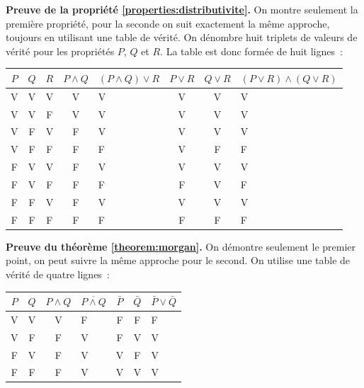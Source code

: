 \documentclass[10pt,notheorems]{beamer}
\theoremstyle{plain}
\theoremstyle{definition} %
\begin{document}
  \begin{notes}
    \mbox{}
    \textbf{Preuve de la propriété \autoref{properties:distributivite}.}
    On montre seulement la première propriété, pour la seconde on suit
    exactement la même approche, toujours en utilisant une table de
    vérité. On dénombre huit triplets de valeurs de vérité pour les
    propriétés $P$, $Q$ et $R$. La table est donc formée de huit
    lignes :
    \begin{table}[H]
      \centering
      \begin{tabular}[H]{|ccc|cgccg|}
        \hline
        $P$ & $Q$ & $R$ & $P\land Q$ & $(P\land Q)\lor R$ & $P\lor R$ & $Q \lor R$ & $(P\lor R)\land (Q \lor R)$ \\ \hline
        V & V & V & V & V & V & V & V \\
        V & V & F & V & V & V & V & V \\
        V & F & V & F & V & V & V & V \\
        V & F & F & F & F & V & F & F \\
        F & V & V & F & V & V & V & V \\
        F & V & F & F & F & F & V & F \\
        F & F & V & F & V & V & V & V \\
        F & F & F & F & F & F & F & F \\
        \hline\hline
      \end{tabular}
    \end{table}

    \bigskip\bigskip

    \textbf{Preuve du théorème \autoref{theorem:morgan}.} On démontre seulement le premier point, on peut suivre la même approche pour le second. On utilise une table de vérité de quatre lignes :
    \begin{table}[H]
      \centering
      \begin{tabular}[H]{|cc|cgccg|}
        \hline
        $P$ & $Q$ & $P\land Q$ & $\overline{P\land Q}$ & $\bar P$ & $\bar Q$ & $\bar P \lor \bar Q$ \\ \hline
        V & V & V & F & F & F & F\\
        V & F & F & V & F & V & V\\
        F & V & F & V & V & F & V\\
        F & F & F & V & V & V & V\\
        \hline\hline
      \end{tabular}
    \end{table}

    \vspace*{\fill}
    
  \end{notes}
\end{document}
